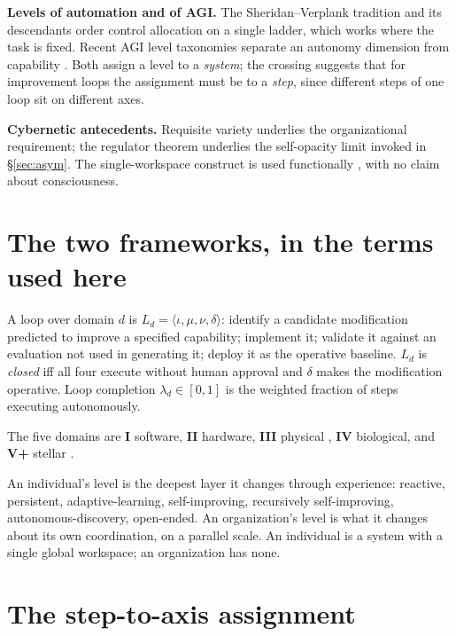 \documentclass[11pt]{article}
\begin{document}
\textbf{Levels of automation and of AGI.} The Sheridan--Verplank tradition \citep{sheridan1978human} and its descendants \citep{sae2021j3016} order control allocation on a single ladder, which works where the task is fixed. Recent AGI level taxonomies separate an autonomy dimension from capability \citep{morris2024levels}. Both assign a level to a \emph{system}; the crossing suggests that for improvement loops the assignment must be to a \emph{step}, since different steps of one loop sit on different axes.

\textbf{Cybernetic antecedents.} Requisite variety \citep{ashby1956introduction} underlies the organizational requirement; the regulator theorem \citep{conant1970every} underlies the self-opacity limit invoked in \S\ref{sec:asym}. The single-workspace construct is used functionally \citep{baars1988cognitive,dehaene2011experimental}, with no claim about consciousness.

\section{The two frameworks, in the terms used here}

A loop over domain $d$ is $L_d = \langle \iota, \mu, \nu, \delta \rangle$: identify a candidate modification predicted to improve a specified capability; implement it; validate it against an evaluation not used in generating it; deploy it as the operative baseline. $L_d$ is \emph{closed} iff all four execute without human approval and $\delta$ makes the modification operative. Loop completion $\lambda_d \in [0,1]$ is the weighted fraction of steps executing autonomously.

The five domains are \textbf{I} software, \textbf{II} hardware, \textbf{III} physical \citep{vonneumann1966theory}, \textbf{IV} biological, and \textbf{V+} stellar \citep{kardashev1964transmission}.

An individual's level is the deepest layer it changes through experience: reactive, persistent, adaptive-learning, self-improving, recursively self-improving, autonomous-discovery, open-ended. An organization's level is what it changes about its own coordination, on a parallel scale. An individual is a system with a single global workspace; an organization has none.

\section{The step-to-axis assignment}\label{sec:assign}
\end{document}

